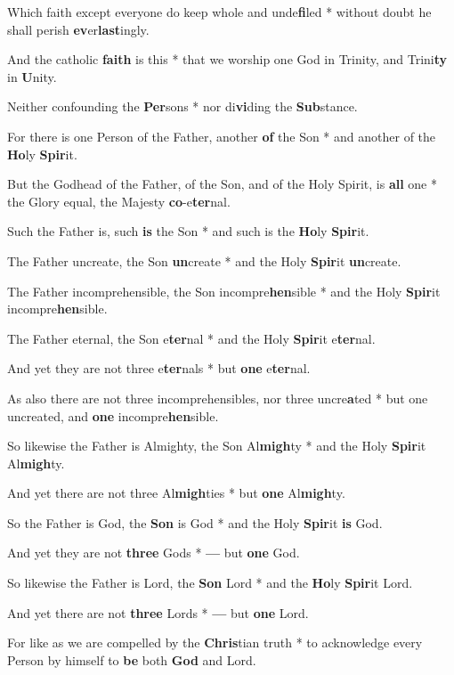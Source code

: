 \begin{multicols}{2}
	Which faith except everyone do keep whole and unde\textbf{fi}led * without doubt he shall perish \textbf{ev}er\textbf{last}ingly.
	
	And the catholic \textbf{faith} is this * that we worship one God in Trinity, and Trini\textbf{ty} in \textbf{U}nity.
	
	Neither confounding the \textbf{Per}sons * nor di\textbf{vi}ding the \textbf{Sub}stance.
	
	For there is one Person of the Father, another \textbf{of} the Son * and another of the \textbf{Ho}ly \textbf{Spir}it.
	
	But the Godhead of the Father, of the Son, and of the Holy Spirit, is \textbf{all} one * the Glory equal, the Majesty \textbf{co}-e\textbf{ter}nal.
	
	Such the Father is, such \textbf{is} the Son * and such is the \textbf{Ho}ly \textbf{Spir}it.
	
	The Father uncreate, the Son \textbf{un}create * and the Holy \textbf{Spir}it \textbf{un}create.
	
	The Father incomprehensible, the Son incompre\textbf{hen}sible * and the Holy \textbf{Spir}it incompre\textbf{hen}sible.
	
	The Father eternal, the Son e\textbf{ter}nal * and the Holy \textbf{Spir}it e\textbf{ter}nal.
	
	And yet they are not three e\textbf{ter}nals * but \textbf{one} e\textbf{ter}nal.
	
	As also there are not three incomprehensibles, nor three uncre\textbf{a}ted * but one uncreated, and \textbf{one} incompre\textbf{hen}sible.
	
	So likewise the Father is Almighty, the Son Al\textbf{migh}ty * and the Holy \textbf{Spir}it Al\textbf{migh}ty.
	
	And yet there are not three Al\textbf{migh}ties * but \textbf{one} Al\textbf{migh}ty.
	
	So the Father is God, the \textbf{Son} is God * and the Holy \textbf{Spir}it \textbf{is} God.
	
	And yet they are not \textbf{three} Gods * \textbf{---} but \textbf{one} God.
	
	So likewise the Father is Lord, the \textbf{Son} Lord * and the \textbf{Ho}ly \textbf{Spir}it Lord.
	
	And yet there are not \textbf{three} Lords * \textbf{---} but \textbf{one} Lord.
	
	For like as we are compelled by the \textbf{Chris}tian truth * to acknowledge every Person by himself to \textbf{be} both \textbf{God} and Lord.
	

\end{multicols}
